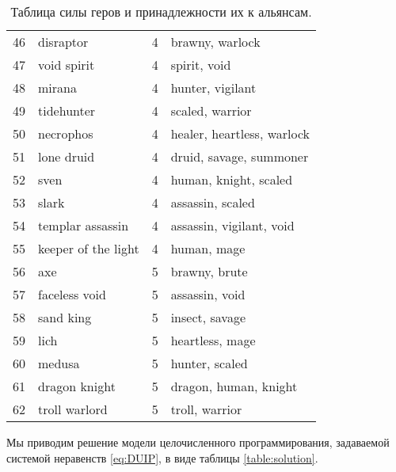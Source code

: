 \documentclass{article}
\begin{document}
\begin{table}
{\begin{tabular}{llrl}
46 &            disraptor &      4 &               brawny, warlock  \\
47 &          void spirit &      4 &                   spirit, void \\
48 &               mirana &      4 &               hunter, vigilant \\
49 &           tidehunter &      4 &               scaled, warrior  \\
50 &            necrophos &      4 &    healer, heartless, warlock  \\
51 &           lone druid &      4 &        druid, savage, summoner \\
52 &                 sven &      4 &          human, knight, scaled \\
53 &                slark &      4 &               assassin, scaled \\
54 &     templar assassin &      4 &       assassin, vigilant, void \\
55 &  keeper of the light &      4 &                    human, mage \\
56 &                  axe &      5 &                  brawny, brute \\
57 &        faceless void &      5 &                 assassin, void \\
58 &            sand king &      5 &                 insect, savage \\
59 &                 lich &      5 &                heartless, mage \\
60 &               medusa &      5 &                 hunter, scaled \\
61 &        dragon knight &      5 &          dragon, human, knight \\
62 &        troll warlord &      5 &                troll, warrior  \\
\bottomrule
\end{tabular}
}
\caption{Таблица силы геров и принадлежности их к альянсам. }
\label{table:aliances}
\end{table}


Мы приводим решение модели целочисленного программирования, задаваемой системой неравенств  \eqref{eq:DUIP}, в виде таблицы \ref{table:solution}.
\end{document}
